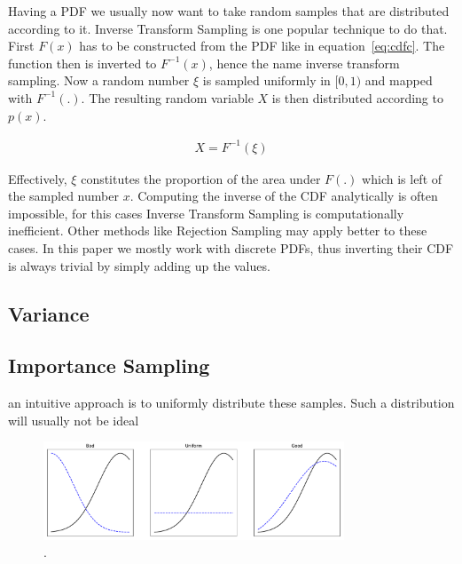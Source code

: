 Having a PDF we usually now want to take random samples that are distributed according to it. Inverse Transform Sampling is one popular technique to do that. First $F(x)$ has to be constructed from the PDF like in equation~\ref{eq:cdfc}. The function then is inverted to $F^{-1}(x)$, hence the name inverse transform sampling. Now a random number $\xi$ is sampled uniformly in $[0, 1)$ and mapped with $F^{-1}(.)$. The resulting random variable $X$ is then distributed according to $p(x)$.

\begin{align}
 X = F^{-1}(\xi)
\end{align}

Effectively, $\xi$ constitutes the proportion of the area under $F(.)$ which is left of the sampled number $x$. Computing the inverse of the CDF analytically is often impossible, for this cases Inverse Transform Sampling is computationally inefficient. Other methods like Rejection Sampling may apply better to these cases. In this paper we mostly work with discrete PDFs, thus inverting their CDF is always trivial by simply adding up the values.

\subsection{Variance}



\subsection{Importance Sampling}
\label{sec:IS}


an intuitive approach is to uniformly distribute these samples. Such a distribution will usually not be ideal
\begin{figure}
    \centering
    \includegraphics[width=0.8\textwidth]{figures/plots/importancesampling.pdf}
    \caption{.}
    \label{fig:importancesample}
\end{figure}











